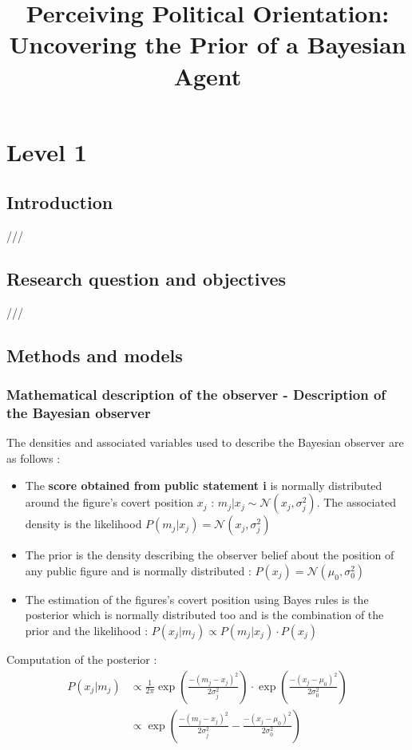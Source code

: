 \documentclass{article}
\title{Perceiving Political Orientation: Uncovering the Prior of a Bayesian Agent}
\author{}
\date{}
\begin{document}
\maketitle

\section*{Level 1}
\subsection*{Introduction}
///
\subsection*{Research question and objectives}
///
\subsection*{Methods and models}
\subsubsection*{Mathematical description of the observer - Description of the Bayesian observer}
The densities and associated variables used to describe the Bayesian observer are as follows :
\begin{itemize}
    \item The \textbf{score obtained from public statement i} is normally distributed around the figure’s covert position $x_j$ : $m_j|x_j \sim \mathcal{N}(x_j, \sigma^2_j)$. The associated density is the likelihood $P(m_j|x_j) = \mathcal{N}(x_j, \sigma^2_j)$
    \item The prior is the density describing the observer belief about the position of any public figure and is normally distributed : $P(x_j)=\mathcal{N}(\mu_0, \sigma^2_0)$
    \item The estimation of the figures's covert position using Bayes rules is the posterior which is normally distributed too and is the combination of the prior and the likelihood : $P(x_j |m_j)\propto P(m_j|x_j)\cdot P(x_j)$\\
\end{itemize}
Computation of the posterior :\\
\begin{align*}
P(x_j | m_j) &\propto \frac{1}{2 \pi} \exp\left( \frac{-(m_j-x_j)^2}{2 \sigma^2_j} \right) \cdot \exp\left( \frac{-(x_j-\mu_0)^2}{2 \sigma_0^2} \right) \\
&\propto \exp\left( \frac{-(m_j-x_j)^2}{2 \sigma^2_j} - \frac{-(x_j-\mu_0)^2}{2 \sigma_0^2} \right) \\
\end{align*}
\end{document}

